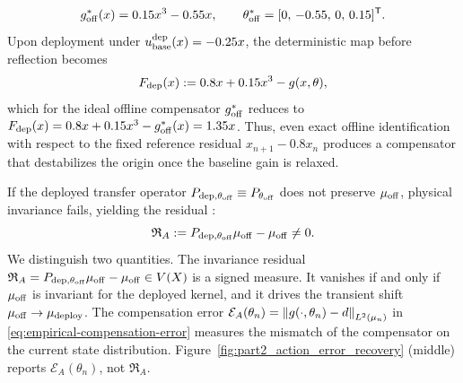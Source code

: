 \[
    g_{\rm off}^*(x) = 0.15x^3 - 0.55x, \qquad \theta_{\rm off}^* = [0,\, -0.55,\, 0,\, 0.15]^{\mathsf T}.
\]
Upon deployment under $u_{\rm base}^{\rm dep}(x)=-0.25x$, the deterministic map before reflection becomes
\begin{equation}
    F_{\rm dep}(x) := 0.8x + 0.15x^3 - g(x,\theta),
    \label{eq:F-dep-general}
\end{equation}
which for the ideal offline compensator $g_{\rm off}^*$ reduces to $F_{\rm dep}(x) = 0.8x + 0.15x^3 - g_{\rm off}^*(x) = 1.35x$. Thus, even exact offline identification with respect to the fixed reference residual $x_{n+1}-0.8x_n$ produces a compensator that destabilizes the origin once the baseline gain is relaxed.

If the deployed transfer operator $P_{\rm dep,\theta_{\rm off}} \equiv P_{\theta_{\rm off}}$ does not preserve $\mu_{\rm off}$, physical invariance fails, yielding the residual \cite{LippiActionError}:
\begin{equation}
    \mathfrak{R}_A := P_{\rm dep,\theta_{\rm off}}\mu_{\rm off} - \mu_{\rm off} \neq 0.
    \label{eq:action-residual-ref}
\end{equation}
We distinguish two quantities. The invariance residual $\mathfrak{R}_A = P_{\rm dep,\theta_{\rm off}}\mu_{\rm off}-\mu_{\rm off}\in V(X)$ is a signed measure. It vanishes if and only if $\mu_{\rm off}$ is invariant for the deployed kernel, and it drives the transient shift $\mu_{\rm off}\to\mu_{\rm deploy}$. The compensation error $\mathcal{E}_A(\theta_n)=\left\lVert g(\cdot,\theta_n)-d\right\rVert_{L^2(\mu_n)}$ in \eqref{eq:empirical-compensation-error} measures the mismatch of the compensator on the current state distribution. Figure~\ref{fig:part2_action_error_recovery} (middle) reports $\mathcal{E}_A(\theta_n)$, not $\mathfrak{R}_A$.

